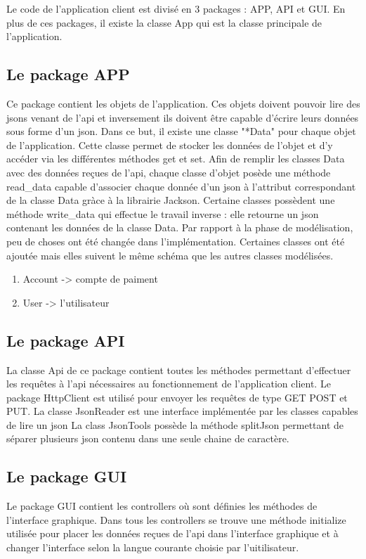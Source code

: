 \documentclass[../rapport.tex]{subfiles}
\begin{document}
Le code de l'application client est divisé en 3 packages : APP, API et GUI.
En plus de ces packages, il existe la classe App qui est la classe principale de l'application. 

\subsection{Le package APP}
Ce package contient les objets de l'application. Ces objets doivent pouvoir lire des jsons venant de l'api et inversement ils doivent être capable
d'écrire leurs données sous forme d'un json. Dans ce but, il existe une classe "*Data" pour chaque objet de l'application. Cette classe permet de stocker 
les données de l'objet et d'y accéder via les différentes méthodes get et set. 
Afin de remplir les classes Data avec des données reçues de l'api, chaque classe d'objet posède une méthode read_data capable d'associer
chaque donnée d'un json à l'attribut correspondant de la classe Data gràce à la librairie Jackson.  
Certaine classes possèdent une méthode write_data qui effectue le travail inverse : elle retourne un json contenant les données de la classe Data.
Par rapport à la phase de modélisation, peu de choses ont été changée dans l'implémentation. Certaines classes ont été ajoutée mais elles suivent le même schéma que 
les autres classes modélisées.

\begin{enumerate}
\item Account -> compte de paiment
\item User -> l'utilisateur
\end{enumerate}

\subsection{Le package API}
La classe Api de ce package contient toutes les méthodes permettant d'effectuer les requêtes à l'api nécessaires au fonctionnement de l'application client.
Le package HttpClient est utilisé pour envoyer les requêtes de type GET POST et PUT.
La classe JsonReader est une interface implémentée par les classes capables de lire un json
La class JsonTools possède la méthode splitJson permettant de séparer plusieurs json contenu dans une seule chaine de caractère.

\subsection{Le package GUI}
Le package GUI contient les controllers où sont définies les méthodes de l'interface graphique. 
Dans tous les controllers se trouve une méthode initialize utilisée pour placer les données reçues de l'api dans l'interface graphique et à changer l'interface
selon la langue courante choisie par l'uitilisateur.
\end{document}
